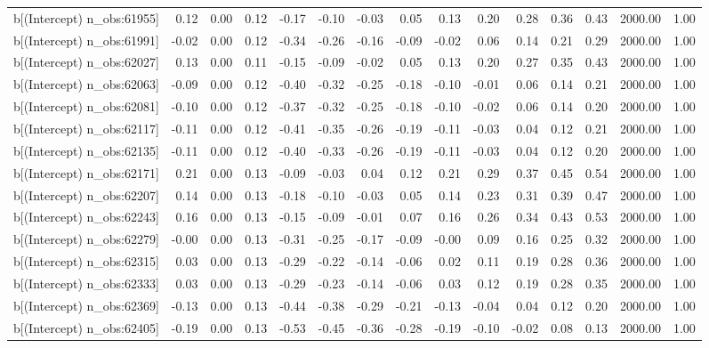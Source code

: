 \begin{table}[ht]
\begin{tabular}{rrrrrrrrrrrrrrr}
  b[(Intercept) n\_obs:61955] & 0.12 & 0.00 & 0.12 & -0.17 & -0.10 & -0.03 & 0.05 & 0.13 & 0.20 & 0.28 & 0.36 & 0.43 & 2000.00 & 1.00 \\ 
  b[(Intercept) n\_obs:61991] & -0.02 & 0.00 & 0.12 & -0.34 & -0.26 & -0.16 & -0.09 & -0.02 & 0.06 & 0.14 & 0.21 & 0.29 & 2000.00 & 1.00 \\ 
  b[(Intercept) n\_obs:62027] & 0.13 & 0.00 & 0.11 & -0.15 & -0.09 & -0.02 & 0.05 & 0.13 & 0.20 & 0.27 & 0.35 & 0.43 & 2000.00 & 1.00 \\ 
  b[(Intercept) n\_obs:62063] & -0.09 & 0.00 & 0.12 & -0.40 & -0.32 & -0.25 & -0.18 & -0.10 & -0.01 & 0.06 & 0.14 & 0.21 & 2000.00 & 1.00 \\ 
  b[(Intercept) n\_obs:62081] & -0.10 & 0.00 & 0.12 & -0.37 & -0.32 & -0.25 & -0.18 & -0.10 & -0.02 & 0.06 & 0.14 & 0.20 & 2000.00 & 1.00 \\ 
  b[(Intercept) n\_obs:62117] & -0.11 & 0.00 & 0.12 & -0.41 & -0.35 & -0.26 & -0.19 & -0.11 & -0.03 & 0.04 & 0.12 & 0.21 & 2000.00 & 1.00 \\ 
  b[(Intercept) n\_obs:62135] & -0.11 & 0.00 & 0.12 & -0.40 & -0.33 & -0.26 & -0.19 & -0.11 & -0.03 & 0.04 & 0.12 & 0.20 & 2000.00 & 1.00 \\ 
  b[(Intercept) n\_obs:62171] & 0.21 & 0.00 & 0.13 & -0.09 & -0.03 & 0.04 & 0.12 & 0.21 & 0.29 & 0.37 & 0.45 & 0.54 & 2000.00 & 1.00 \\ 
  b[(Intercept) n\_obs:62207] & 0.14 & 0.00 & 0.13 & -0.18 & -0.10 & -0.03 & 0.05 & 0.14 & 0.23 & 0.31 & 0.39 & 0.47 & 2000.00 & 1.00 \\ 
  b[(Intercept) n\_obs:62243] & 0.16 & 0.00 & 0.13 & -0.15 & -0.09 & -0.01 & 0.07 & 0.16 & 0.26 & 0.34 & 0.43 & 0.53 & 2000.00 & 1.00 \\ 
  b[(Intercept) n\_obs:62279] & -0.00 & 0.00 & 0.13 & -0.31 & -0.25 & -0.17 & -0.09 & -0.00 & 0.09 & 0.16 & 0.25 & 0.32 & 2000.00 & 1.00 \\ 
  b[(Intercept) n\_obs:62315] & 0.03 & 0.00 & 0.13 & -0.29 & -0.22 & -0.14 & -0.06 & 0.02 & 0.11 & 0.19 & 0.28 & 0.36 & 2000.00 & 1.00 \\ 
  b[(Intercept) n\_obs:62333] & 0.03 & 0.00 & 0.13 & -0.29 & -0.23 & -0.14 & -0.06 & 0.03 & 0.12 & 0.19 & 0.28 & 0.35 & 2000.00 & 1.00 \\ 
  b[(Intercept) n\_obs:62369] & -0.13 & 0.00 & 0.13 & -0.44 & -0.38 & -0.29 & -0.21 & -0.13 & -0.04 & 0.04 & 0.12 & 0.20 & 2000.00 & 1.00 \\ 
  b[(Intercept) n\_obs:62405] & -0.19 & 0.00 & 0.13 & -0.53 & -0.45 & -0.36 & -0.28 & -0.19 & -0.10 & -0.02 & 0.08 & 0.13 & 2000.00 & 1.00 \\ 

\end{tabular}
\end{table}
